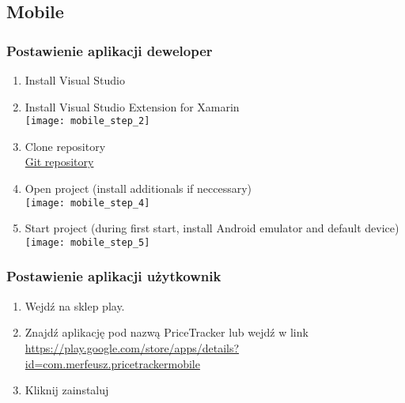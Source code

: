 \documentclass{article}
\begin{document}
    \subsection{Mobile}
        \subsubsection{Postawienie aplikacji deweloper}
         \begin{enumerate}
            \item Install Visual Studio\\
            \item Install Visual Studio Extension for Xamarin\\
                \texttt{[image: mobile\_step\_2]}\\
            \item Clone repository\\
            \href{https://github.com/Price-Tracker-ZMP/Mobile.git}{Git repository}\\
            \item Open project (install additionals if neccessary)\\
                \texttt{[image: mobile\_step\_4]}\\
            \item Start project (during first start, install Android emulator and default device)\\
                \texttt{[image: mobile\_step\_5]}\\
        \end{enumerate}
       
        \subsubsection{Postawienie aplikacji użytkownik}
            \begin{enumerate}
            \item  Wejdź na sklep play.\\
            \item Znajdź aplikację pod nazwą PriceTracker lub wejdź w link\\ \href{https://play.google.com/store/apps/details?id=com.merfeusz.pricetrackermobile}{https://play.google.com/store/apps/details?id=com.merfeusz.pricetrackermobile}\\
            \item  Kliknij zainstaluj\\
        \end{enumerate}
      
\end{document}
